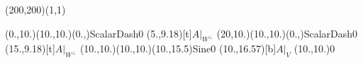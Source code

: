 \unitlength=1bp%

\begin{feynartspicture}(200,200)(1,1)

\FADiagram{}
\FAProp(0.,10.)(10.,10.)(0.,){ScalarDash}{0}
\FALabel(5.,9.18)[t]{$A|_{W^\perp}$}
\FAProp(20,10.)(10.,10.)(0.,){ScalarDash}{0}
\FALabel(15.,9.18)[t]{$A|_{W^\perp}$}
\FAProp(10.,10.)(10.,10.)(10.,15.5){Sine}{0}
\FALabel(10.,16.57)[b]{$A|_V$}
\FAVert(10.,10.){0}
\end{feynartspicture}


